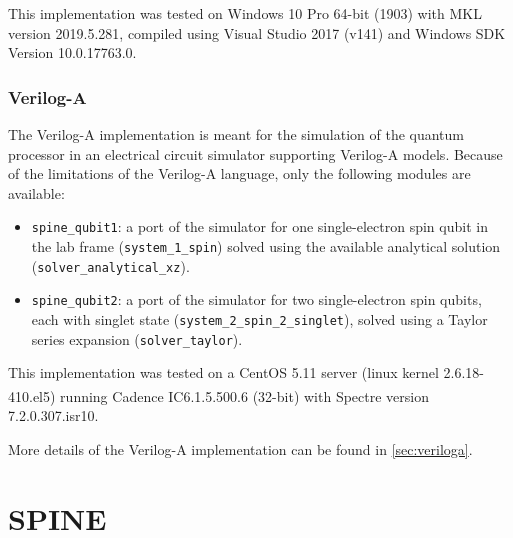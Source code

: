 \documentclass[10pt,a4paper,onecolumn,notitlepage]{article}
\begin{document}
This implementation was tested on Windows 10 Pro 64-bit (1903) with MKL version 2019.5.281, compiled using Visual Studio 2017 (v141) and Windows SDK Version 10.0.17763.0.

\subsubsection{Verilog-A}
The Verilog-A implementation is meant for the simulation of the quantum processor in an electrical circuit simulator supporting Verilog-A models. Because of the limitations of the Verilog-A language, only the following modules are available:
\begin{itemize}
	\item \lstinline{spine_qubit1}: a port of the simulator for one single-electron spin qubit in the lab frame (\lstinline{system_1_spin}) solved using the available analytical solution (\lstinline{solver_analytical_xz}).
	\item \lstinline{spine_qubit2}: a port of the simulator for two single-electron spin qubits, each with singlet state (\lstinline{system_2_spin_2_singlet}), solved using a Taylor series expansion (\lstinline{solver_taylor}).
\end{itemize}

This implementation was tested on a CentOS 5.11 server (linux kernel 2.6.18-410.el5) running Cadence\textsuperscript{\textregistered} IC6.1.5.500.6 (32-bit) with Spectre version 7.2.0.307.isr10.

More details of the Verilog-A implementation can be found in \cref{sec:veriloga}.

\section{SPINE}
\end{document}
